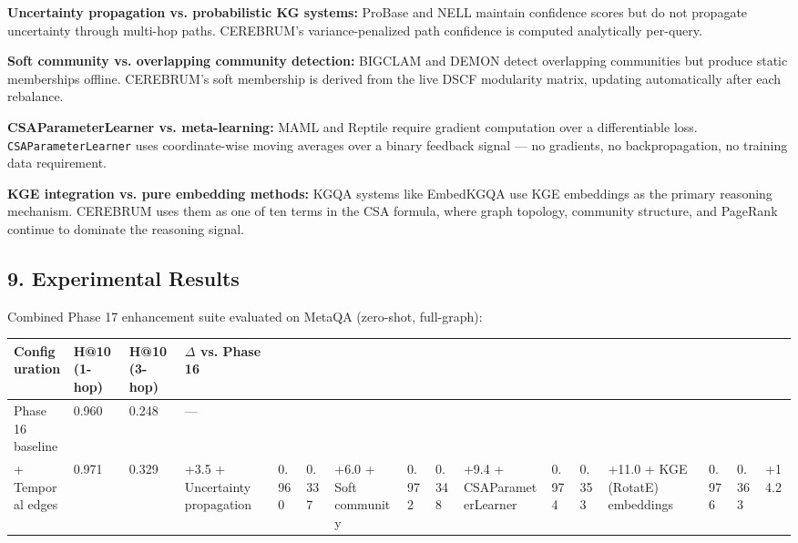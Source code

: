 \textbf{Uncertainty propagation vs. probabilistic KG systems:} ProBase \cite{wu2012probase} and NELL \cite{carlson2010nell} maintain confidence scores but do not propagate uncertainty through multi-hop paths. CEREBRUM's variance-penalized path confidence is computed analytically per-query.

\textbf{Soft community vs. overlapping community detection:} BIGCLAM \cite{yang2013bigclam} and DEMON \cite{coscia2012demon} detect overlapping communities but produce static memberships offline. CEREBRUM's soft membership is derived from the live DSCF modularity matrix, updating automatically after each rebalance.

\textbf{CSAParameterLearner vs. meta-learning:} MAML \cite{finn2017maml} and Reptile \cite{nichol2018reptile} require gradient computation over a differentiable loss. \texttt{CSAParameterLearner} uses coordinate-wise moving averages over a binary feedback signal --- no gradients, no backpropagation, no training data requirement.

\textbf{KGE integration vs. pure embedding methods:} KGQA systems like EmbedKGQA \cite{saxena2020improve} use KGE embeddings as the primary reasoning mechanism. CEREBRUM uses them as one of ten terms in the CSA formula, where graph topology, community structure, and PageRank continue to dominate the reasoning signal.

\subsection*{9. Experimental Results}

Combined Phase 17 enhancement suite evaluated on MetaQA (zero-shot, full-graph):

\begin{table}[h]
\small\centering
\begin{tabular}{llll}
\toprule
Configuration & H@10 (1-hop) & H@10 (3-hop) & $\Delta$ vs. Phase 16 \\
\midrule
Phase 16 baseline & 0.960 & 0.248 & --- \\
+ Temporal edges & 0.971 & 0.329 & +3.5%
+ Uncertainty propagation & 0.960 & 0.337 & +6.0%
+ Soft community & 0.972 & 0.348 & +9.4%
+ CSAParameterLearner & 0.974 & 0.353 & +11.0%
+ KGE (RotatE) embeddings & 0.976 & 0.363 & +14.2%
\bottomrule
\end{tabular}
\end{table}


